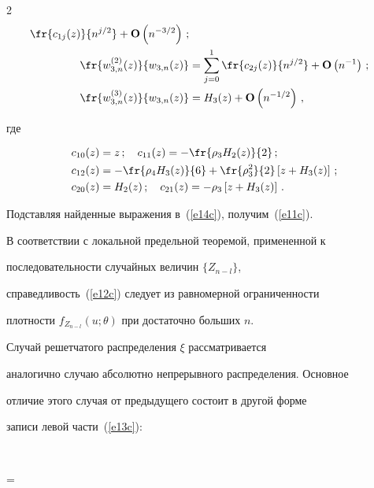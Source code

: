 \begin{multicols}{2}
\begin{align*}
       \fr{c_{1j}(z)}{n^{j/2}}+{\bf O}\left(n^{-3/2}\right)\,;\\


 \fr{w_{3,n}^{(2)}(z)}{w_{3,n}(z)}&=\sum_{j=0}^1


       \fr{c_{2j}(z)}{n^{j/2}}+{\bf O}\left(n^{-1}\right)\,;\\


      \fr{w_{3,n}^{(3)}(z)}{w_{3,n}(z)}&=H_3(z)+


       {\bf O}\left(n^{-1/2}\right)\,,


\end{align*}


  где


\begin{align*}   


c_{10}(z)&=z\,;\quad c_{11}(z)=-\fr{\rho_3H_2(z)}{2}\,;\\


c_{12}(z)&=-\fr{\rho_4H_3(z)}{6}+ \fr{\rho_3^2}{2}\left[z+ H_3(z)\right]\,;\\


c_{20}(z)&=H_2(z)\,;\quad c_{21}(z)=-\rho_3\left[z+ H_3(z)\right]\,.


\end{align*}


  Подставляя найденные выражения в~(\ref{e14c}), получим~(\ref{e11c}).





  В соответствии с локальной предельной теоремой, примененной к


  последовательности случайных величин $\{Z_{n-l}\}$,


  справедливость~(\ref{e12c}) следует из равномерной ограниченности


  плотности $f_{Z_{n-l}}(u;\theta)$ при достаточно больших $n$.





  Случай решетчатого распределения $\xi$ рас\-смат\-ри\-ва\-ет\-ся


  аналогично случаю абсолютно непрерывного распределения. Основное


  отличие этого случая от предыдущего состоит в другой форме


  записи левой части~(\ref{e13c}):


  $$ 


=


     \cdot {}



\end{multicols}
